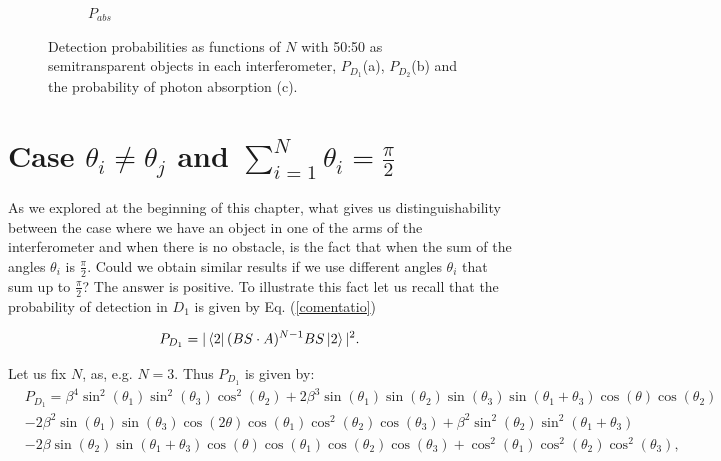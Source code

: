 \documentclass[12pt]{book}
\begin{document}
\begin{figure}[!t]
\begin{subfigure}[b]{0.45\linewidth}
\caption{$P_{abs}$}
\label{fig:BS1}
\end{subfigure}
\caption{Detection probabilities as functions of $N$ with 50:50 as semitransparent objects in each interferometer, $P_{D_{1}}$(a), $P_{D_{2}}$(b) and the probability of photon absorption (c).}
\label{Azuma2}
\end{figure}




 


\section{Case $\theta_{i} \neq \theta_{j}$ and $\sum_{i=1}^{N}\theta_{i}=\frac{\pi}{2}$}

As we explored at the beginning of this chapter, what gives us distinguishability between the case where we have an object in one of the arms of the interferometer and when there is no obstacle, is the fact that when the sum of the angles $\theta_{i}$ is $\frac{ \pi}{2}$. Could we obtain similar results if we use different angles $\theta_{i}$ that sum up to $\frac{\pi}{2}$? The answer is positive. To illustrate this fact let us recall that the probability of detection in $D_{1}$ is given by Eq. (\ref{comentatio})

\begin{equation*}
P_{D_{1}}=|\bra{2} (BS \cdot A)^{N-1}BS \ket{2}|^2.
\end{equation*}

Let us fix $N$, as, e.g. $N=3$. Thus $P_{D_{1}}$ is given by:
\small
\begin{align*}
&P_{D_{1}}=\beta^{4} \sin^{2}{\left(\theta_{1} \right)} \sin^{2}{\left(\theta_{3} \right)} \cos^{2}{\left(\theta_{2} \right)} + 2 \beta^{3} \sin{\left(\theta_{1} \right)} \sin{\left(\theta_{2} \right)} \sin{\left(\theta_{3} \right)} \sin{\left(\theta_{1} + \theta_{3} \right)} \cos{\left(\theta \right)} \cos{\left(\theta_{2} \right)} \\
 & - 2 \beta^{2} \sin{\left(\theta_{1} \right)} \sin{\left(\theta_{3} \right)} \cos{\left(2 \theta \right)} \cos{\left(\theta_{1} \right)} \cos^{2}{\left(\theta_{2} \right)} \cos{\left(\theta_{3} \right)} + \beta^{2} \sin^{2}{\left(\theta_{2} \right)} \sin^{2}{\left(\theta_{1} + \theta_{3} \right)} \\
 & - 2 \beta \sin{\left(\theta_{2} \right)} \sin{\left(\theta_{1} + \theta_{3} \right)} \cos{\left(\theta \right)} \cos{\left(\theta_{1} \right)} \cos{\left(\theta_{2} \right)} \cos{\left(\theta_{3} \right)} + \cos^{2}{\left(\theta_{1} \right)} \cos^{2}{\left(\theta_{2} \right)} \cos^{2}{\left(\theta_{3} \right)},
\end{align*}
\normalsize
\end{document}
